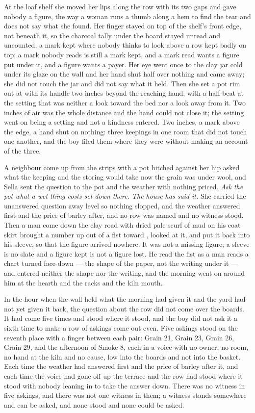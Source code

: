 At the loaf shelf she moved her lips along the row with its two gaps and gave nobody a figure, the way a woman runs a thumb along a hem to find the tear and does not say what she found. Her finger stayed on top of the shelf's front edge, not beneath it, so the charcoal tally under the board stayed unread and uncounted, a mark kept where nobody thinks to look above a row kept badly on top; a mark nobody reads is still a mark kept, and a mark read wants a figure put under it, and a figure wants a payer. Her eye went once to the clay jar cold under its glaze on the wall and her hand shut half over nothing and came away; she did not touch the jar and did not say what it held. Then she set a pot rim out at  with its handle two inches beyond the reaching hand, with a half-beat at the setting that was neither a look toward the bed nor a look away from it. Two inches of air was the whole distance and the hand could not close it; the setting went on being a setting and not a kindness entered. Two inches, a mark above the edge, a hand shut on nothing: three keepings in one room that did not touch one another, and the boy filed them where they were without making an account of the three.

A neighbour come up from the strips with a pot hitched against her hip asked what the keeping and the storing would take now the grain was under wool, and Sella sent the question to the pot and the weather with nothing priced. \emph{Ask the pot what a wet thing costs set down there. The house has said it.} She carried the unanswered question away level so nothing slopped, and the weather answered first and the price of barley after, and no row was named and no witness stood. Then a man come down the clay road with dried pale scurf of mud on his coat skirt brought a number up out of a fist toward , looked at it, and put it back into his sleeve, so that the figure arrived nowhere. It was not a missing figure; a sleeve is no slate and a figure kept is not a figure lost. He read the fist as a man reads a chart turned face-down --- the shape of the paper, not the writing under it --- and entered neither the shape nor the writing, and the morning went on around him at the hearth and the racks and the kiln mouth.

\scenebreak

In the hour when the wall held what the morning had given it and the yard had not yet given it back, the question about the row did not come over the boards. It had come five times and stood where it stood, and the boy did not ask it a sixth time to make a row of askings come out even. Five askings stood on the seventh place with a finger between each pair: Grain 21, Grain 23, Grain 26, Grain 29, and the afternoon of Smoke 8, each in a voice with no owner, no room, no hand at the kiln and no cause, low into the boards and not into the basket. Each time the weather had answered first and the price of barley after it, and each time the voice had gone off up the terrace and the row had stood where it stood with nobody leaning in to take the answer down. There was no witness in five askings, and there was not one witness in them; a witness stands somewhere and can be asked, and none stood and none could be asked.


